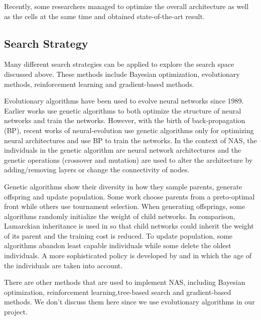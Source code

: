 \documentclass[conference]{IEEEtran}
\begin{document}
    Recently, some researchers managed to optimize the overall architecture as well as the cells at the same time and obtained state-of-the-art result\cite{liu2019auto}.
    
    \subsection{Search Strategy}
    
    Many different search strategies can be applied to explore the search space discussed above. These methods include Bayesian optimization, evolutionary methods, reinforcement learning and gradient-based methods. 

    Evolutionary algorithms have been used to evolve neural networks since 1989\cite{miller1989designing}. Earlier works use genetic algorithms to both optimize the structure of neural networks and train the networks\cite{stanley2002evolving}. However, with the birth of back-propagation (BP), recent works of neural-evolution use genetic algorithms only for optimizing neural architectures and use BP to train the networks\cite{real2017large}. In the context of NAS, the individuals in the genetic algorithm are neural network architectures and the genetic operations (crossover and mutation) are used to alter the architecture by adding/removing layers or change the connectivity of nodes.

    Genetic algorithms show their diversity in how they sample parents, generate offspring and update population. Some work choose parents from a preto-optimal front\cite{elsken2018efficient} while others use tournament selection\cite{liu2018progressive}\cite{real2018regularized}\cite{real2017large}. When generating offsprings, some algorithms randomly initialize the weight of child networks. In comparison, Lamarckian inheritance is used in \cite{elsken2018efficient} so that child networks could inherit the weight of its parent and the training cost is reduced. To update population, some algorithms abandon least capable individuals\cite{real2017large} while some delete the oldest individuals\cite{real2018regularized}. A more sophisticated policy is developed by \cite{Hornby:2006:AAP:1143997.1144142} and \cite{DBLP:journals/corr/abs-1802-01548} in which the age of the individuals are taken into account.
    
    There are other methods that are used to implement NAS, including Bayesian optimization, reinforcement learning,tree-based search and gradient-based methods. We don't discuss them here since we use evolutionary algorithms in our project.
\end{document}
